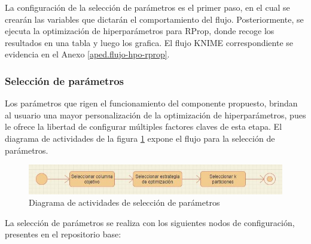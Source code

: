 La configuración de la selección de parámetros es el primer paso, en el cual se crearán las variables que dictarán el comportamiento del flujo. Posteriormente, se ejecuta la optimización de hiperparámetros para RProp, donde recoge los resultados en una tabla y luego los grafica. El flujo KNIME correspondiente se evidencia en el Anexo \ref{aped.flujo-hpo-rprop}.

\subsubsection{Selección de parámetros}
Los parámetros que rigen el funcionamiento del componente propuesto, brindan al usuario una mayor personalización de la optimización de hiperparámetros, pues le ofrece la libertad de configurar múltiples factores claves de esta etapa. El diagrama de actividades de la figura \ref{fig:diagrama-act-selecc-param-hpo} expone el flujo para la selección de parámetros.

\begin{figure}[H]
	\centering
	\includegraphics[width=0.7\linewidth]{"figuras/capi 2/diagrama-act-selecc-param-hpo"}
	\caption[Diagrama de actividades de selección de parámetros]{Diagrama de actividades de selección de parámetros}
	\label{fig:diagrama-act-selecc-param-hpo}
\end{figure}

La selección de parámetros se realiza con los siguientes nodos de configuración, presentes en el repositorio base:

